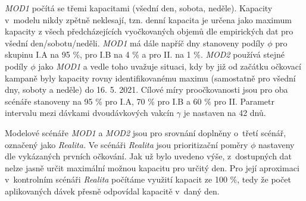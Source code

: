 \emph{MOD1} počítá se třemi kapacitami (všední den, sobota, neděle). Kapacity v~modelu nikdy zpětně neklesají, tzn. denní kapacita je určena jako maximum kapacity z %
všech předcházejících vyočkovaných objemů dle empirických dat pro všední den/sobotu/neděli. \emph{MOD1} má dále napříč dny stanoveny podíly $\phi$ pro skupinu I.A na 95 \%, pro I.B na 4 \% a pro II. na 1 \%.
%
\emph{MOD2} používá stejné podíly  $\phi$ jako \emph{MOD1} a vedle toho uvažuje situaci, kdy by již od začátku očkovací kampaně byly kapacity rovny identifikovanému maximu (samostatně pro všední dny, soboty a neděle) do 16. 5. 2021. 
%
Cílové míry proočkovanosti jsou pro oba scénáře stanoveny na 95 \% pro I.A, 70 \% pro I.B a 60 \% pro II. Parametr intervalu mezi dávkami dvoudávkových vakcín $\gamma$ je nastaven na 42 dnů.


Modelové scénáře \emph{MOD1} a \emph{MOD2} jsou pro srovnání doplněny o~třetí scénář, označený jako \emph{Realita.}  Ve scénáři \emph{Realita} jsou prioritizační poměry $\phi$ nastaveny dle vykázaných prvních očkování. Jak už bylo uvedeno výše, z~dostupných dat nelze jasně určit maximální možnou kapacitu pro určitý den. Pro její aproximaci v~kontrolním scénáři \emph{Realita} počítáme využití kapacit ze 100 \%, tedy že počet aplikovaných dávek přesně odpovídal kapacitě v~daný den.




%


